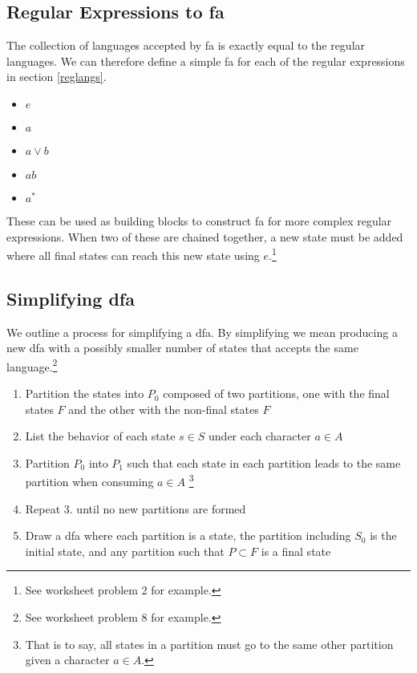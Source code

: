 \documentclass{article}
\begin{document}
		\subsection{Regular Expressions to fa}
			The collection of languages accepted by fa is exactly equal to the regular languages. We can therefore define a simple fa for each of the regular expressions in section \ref{reglangs}. \\
			\begin{itemize}
				\item $e$ \\
				\item $a$
				\item $a \lor b$
				\item $ab$
				\item $a^*$
			\end{itemize}
			These can be used as building blocks to construct fa for more complex regular expressions. When two of these are chained together, a new state must be added where all final states can reach this new state using $e$.\footnote{See worksheet problem 2 for example.}
		\subsection{Simplifying dfa}
		We outline a process for simplifying a dfa. By simplifying we mean producing a new dfa with a possibly smaller number of states that accepts the same language.\footnote{See worksheet problem 8 for example.}
		\begin{enumerate}
			\item Partition the states into $P_0$ composed of two partitions, one with the final states $F$ and the other with the non-final states $\overset{~}{F}$
			\item List the behavior of each state $s \in S$ under each character $a \in A$
			\item Partition $P_0$ into $P_1$ such that each state in each partition leads to the same partition when consuming $a \in A$ \footnote{That is to say, all states in a partition must go to the same other partition given a character $a \in A$.}
			\item Repeat 3. until no new partitions are formed
			\item Draw a dfa where each partition is a state, the partition including $S_0$ is the initial state, and any partition such that $P \subset F$ is a final state  
		\end{enumerate}
\end{document}
